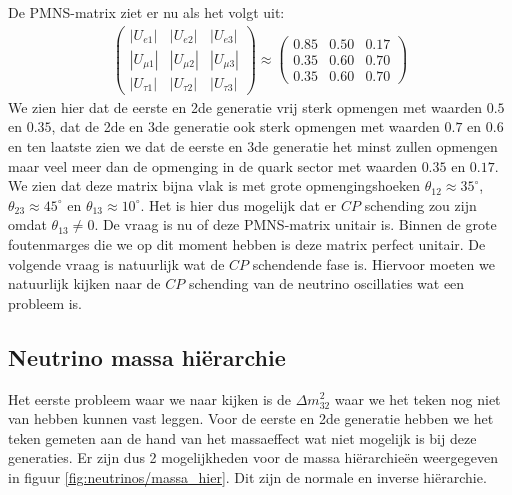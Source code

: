 \documentclass[../main.tex]{subfiles}
\begin{document}
De PMNS-matrix ziet er nu als het volgt uit:
\begin{equation}
    \begin{aligned}
        \label{eq:pmns_matrix_ingevuld}
        \left(\begin{array}{ccc}
                \left|U_{e 1}\right| & \left|U_{e 2}\right| & \left|U_{e 3}\right| \\
                \left|U_{\mu 1}\right| & \left|U_{\mu 2}\right| & \left|U_{\mu 3}\right| \\
                \left|U_{\tau 1}\right| & \left|U_{\tau 2}\right| & \left|U_{\tau 3}\right|
                \end{array}\right) \approx\left(\begin{array}{ccc}
                0.85 & 0.50 & 0.17 \\
                0.35 & 0.60 & 0.70 \\
                0.35 & 0.60 & 0.70
        \end{array}\right)
    \end{aligned}
\end{equation}
We zien hier dat de eerste en 2de generatie vrij sterk opmengen met waarden $0.5$ en $0.35$, dat de 2de en 3de generatie ook sterk opmengen met waarden $0.7$ en $0.6$ en ten laatste zien we dat de eerste en 3de generatie het minst zullen opmengen maar veel meer dan de opmenging in de quark sector met waarden $0.35$ en $0.17$. We zien dat deze matrix bijna vlak is met grote opmengingshoeken $\theta_{12} \approx 35^{\circ}$, $\theta_{23} \approx 45^{\circ}$ en $\theta_{13} \approx 10^{\circ}$. Het is hier dus mogelijk dat er $CP$ schending zou zijn omdat $\theta_{13} \neq 0$. De vraag is nu of deze PMNS-matrix unitair is. Binnen de grote foutenmarges die we op dit moment hebben is deze matrix perfect unitair. De volgende vraag is natuurlijk wat de $CP$ schendende fase is. Hiervoor moeten we natuurlijk kijken naar de $CP$ schending van de neutrino oscillaties wat een probleem is.

\subsection{Neutrino massa hiërarchie}%
\label{sub:neutrino_massa_hierarchie}

Het eerste probleem waar we naar kijken is de $\Delta m_{32}^2$ waar we het teken nog niet van hebben kunnen vast leggen. Voor de eerste en 2de generatie hebben we het teken gemeten aan de hand van het massaeffect wat niet mogelijk is bij deze generaties. Er zijn dus 2 mogelijkheden voor de massa hiërarchieën weergegeven in figuur \ref{fig:neutrinos/massa_hier}. Dit zijn de normale en inverse hiërarchie.
\end{document}
